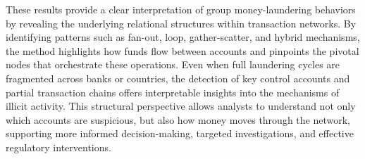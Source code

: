 These results provide a clear interpretation of group money-laundering behaviors by revealing the underlying relational structures within transaction networks. By identifying patterns such as fan-out, loop, gather-scatter, and hybrid mechanisms, the method highlights how funds flow between accounts and pinpoints the pivotal nodes that orchestrate these operations. Even when full laundering cycles are fragmented across banks or countries, the detection of key control accounts and partial transaction chains offers interpretable insights into the mechanisms of illicit activity. This structural perspective allows analysts to understand not only which accounts are suspicious, but also how money moves through the network, supporting more informed decision-making, targeted investigations, and effective regulatory interventions.


